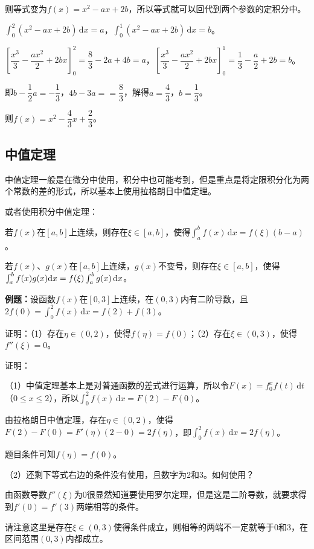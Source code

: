 \documentclass[UTF8, 12pt]{ctexart}
\begin{document}
则等式变为$f(x)=x^2-ax+2b$，所以等式就可以回代到两个参数的定积分中。

$\int_0^2(x^2-ax+2b)\,\textrm{d}x=a$，$\int_0^1(x^2-ax+2b)\,\textrm{d}x=b$。

$\left[\dfrac{x^3}{3}-\dfrac{ax^2}{2}+2bx\right]_0^2=\dfrac{8}{3}-2a+4b=a$，$\left[\dfrac{x^3}{3}-\dfrac{ax^2}{2}+2bx\right]_0^1=\dfrac{1}{3}-\dfrac{a}{2}+2b=b$。

即$b-\dfrac{1}{2}a=-\dfrac{1}{3}$，$4b-3a==\dfrac{8}{3}$，解得$a=\dfrac{4}{3}$，$b=\dfrac{1}{3}$。

则$f(x)=x^2-\dfrac{4}{3}x+\dfrac{2}{3}$。

\subsection{中值定理}

中值定理一般是在微分中使用，积分中也可能考到，但是重点是将定限积分化为两个常数的差的形式，所以基本上使用拉格朗日中值定理。

或者使用积分中值定理：

若$f(x)$在$[a,b]$上连续，则存在$\xi\in[a,b]$，使得$\int_a^bf(x)\,\textrm{d}x=f(\xi)(b-a)$。

若$f(x)$、$g(x)$在$[a,b]$上连续，$g(x)$不变号，则存在$\xi\in[a,b]$，使得$\int_a^bf(x)g(x)\,\\\textrm{d}x=f(\xi)\int_a^bg(x)\,\textrm{d}x$。

\textbf{例题：}设函数$f(x)$在$[0,3]$上连续，在$(0,3)$内有二阶导数，且$2f(0)=\int_0^2f(x)\,\textrm{d}x=f(2)+f(3)$。

证明：（1）存在$\eta\in(0,2)$，使得$f(\eta)=f(0)$；（2）存在$\xi\in(0,3)$，使得$f''(\xi)=0$。

证明：

（1）中值定理基本上是对普通函数的差式进行运算，所以令$F(x)=f_0^xf(t)\,\textrm{d}t$（$0\leqslant x\leqslant2$），所以$\int_0^2f(x)\,\textrm{d}x=F(2)-F(0)$。

由拉格朗日中值定理，存在$\eta\in(0,2)$，使得$F(2)-F(0)=F'(\eta)(2-0)=2f(\eta)$，即$\int_0^2f(x)\,\textrm{d}x=2f(\eta)$。

题目条件可知$f(\eta)=f(0)$。

（2）还剩下等式右边的条件没有使用，且数字为2和3。如何使用？

由函数导数$f''(\xi)$为0很显然知道要使用罗尔定理，但是这是二阶导数，就要求得到$f'(0)=f'(3)$两端相等的条件。

请注意这里是存在$\xi\in(0,3)$使得条件成立，则相等的两端不一定就等于0和3，在区间范围$(0,3)$内都成立。
\end{document}

